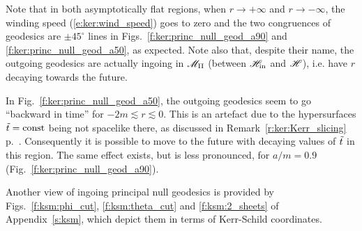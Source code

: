 Note that in both asymptotically flat regions, when $r\rightarrow +\infty$ and
$r\rightarrow -\infty$, the winding speed (\ref{e:ker:wind_speed}) goes to zero
and the two congruences of geodesics are $\pm 45^\circ$ lines
in Figs.~\ref{f:ker:princ_null_geod_a90} and
\ref{f:ker:princ_null_geod_a50}, as expected.
Note also that, despite their name, the outgoing geodesics are actually
ingoing in $\mathscr{M}_{\rm II}$ (between $\mathscr{H}_{\rm in}$ and $\mathscr{H}$), i.e. have $r$ decaying
towards the future.
\begin{remark}
In Fig.~\ref{f:ker:princ_null_geod_a50},
the outgoing geodesics seem to go ``backward in time'' for $-2m \lesssim r \lesssim 0$. This
is an artefact due to the hypersurfaces ${\tilde t} = \mathrm{const}$ being not spacelike
there, as discussed in Remark~\ref{r:ker:Kerr_slicing}
p.~\pageref{r:ker:Kerr_slicing}.
Consequently it is possible to move to the future with decaying values
of ${\tilde t}$ in this region.
The same effect exists, but is less pronounced, for $a/m=0.9$ (Fig.~\ref{f:ker:princ_null_geod_a90}).
\end{remark}

Another view of ingoing principal null geodesics is provided by Figs.~\ref{f:ksm:phi_cut},
\ref{f:ksm:theta_cut} and \ref{f:ksm:2_sheets} of Appendix~\ref{s:ksm}, which
depict them in terms of Kerr-Schild coordinates.

